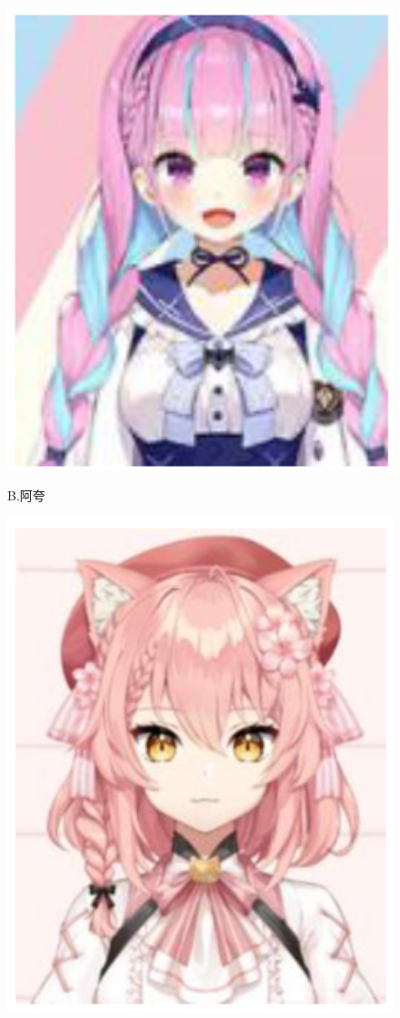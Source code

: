 \documentclass[a4paper]{article}
\begin{document}
\begin{figure}[ht]
\begin{minipage}{0.24\linewidth}
        \centerline{\includegraphics[width=1\textwidth]{aqua.PNG}}
        \centerline{B.阿夸}
    \end{minipage}
    \begin{minipage}{0.24\linewidth}
        \centerline{\includegraphics[width=1\textwidth]{hirro.PNG}}

\end{minipage}
\end{figure}
\end{document}
